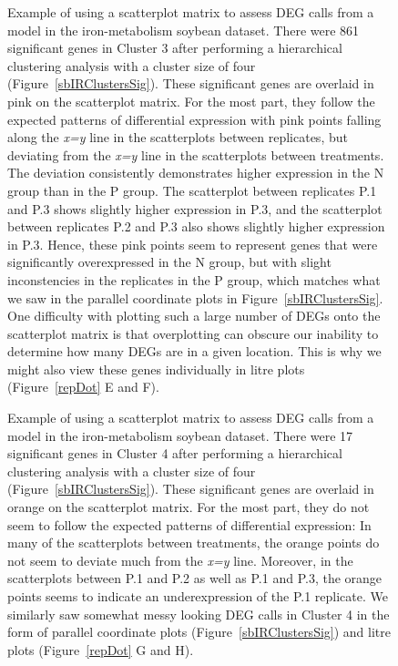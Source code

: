 \documentclass{bmcart}
\begin{document}
\begin{linenumbers}
\begin{backmatter}
\begin{figure}[h!]
\caption{
Example of using a scatterplot matrix to assess DEG calls from a model in the iron-metabolism soybean dataset. There were 861 significant genes in Cluster 3 after performing a hierarchical clustering analysis with a cluster size of four (Figure~\ref{sbIRClustersSig}). These significant genes are overlaid in pink on the scatterplot matrix. For the most part, they follow the expected patterns of differential expression with pink points falling along the \textit{x=y} line in the scatterplots between replicates, but deviating from the \textit{x=y} line in the scatterplots between treatments. The deviation consistently demonstrates higher expression in the N group than in the P group. The scatterplot between replicates P.1 and P.3 shows slightly higher expression in P.3, and the scatterplot between replicates P.2 and P.3 also shows slightly higher expression in P.3. Hence, these pink points seem to represent genes that were significantly overexpressed in the N group, but with slight inconstencies in the replicates in the P group, which matches what we saw in the parallel coordinate plots in Figure~\ref{sbIRClustersSig}. One difficulty with plotting such a large number of DEGs onto the scatterplot matrix is that overplotting can obscure our inability to determine how many DEGs are in a given location. This is why we might also view these genes individually in litre plots (Figure~\ref{repDot} E and F).
\label{sbIRClusterSigSM3}}
\end{figure}

\begin{figure}[h!]
\caption{
Example of using a scatterplot matrix to assess DEG calls from a model in the iron-metabolism soybean dataset. There were 17 significant genes in Cluster 4 after performing a hierarchical clustering analysis with a cluster size of four (Figure~\ref{sbIRClustersSig}). These significant genes are overlaid in orange on the scatterplot matrix. For the most part, they do not seem to follow the expected patterns of differential expression: In many of the scatterplots between treatments, the orange points do not seem to deviate much from the \textit{x=y} line. Moreover, in the scatterplots between P.1 and P.2 as well as P.1 and P.3, the orange points seems to indicate an underexpression of the P.1 replicate. We similarly saw somewhat messy looking DEG calls in Cluster 4 in the form of parallel coordinate plots (Figure~\ref{sbIRClustersSig}) and litre plots (Figure~\ref{repDot} G and H).
\label{sbIRClusterSigSM4}}
\end{figure}


\end{backmatter}
\end{linenumbers}
\end{document}
